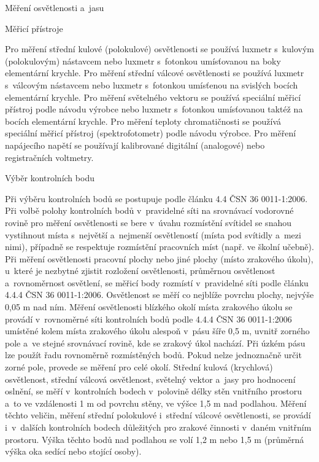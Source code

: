 \chap Měření osvětlenosti a~jasu

\sec Měřicí přístroje

Pro měření střední kulové (polokulové) osvětlenosti se používá luxmetr s~kulovým (polokulovým) nástavcem nebo luxmetr
s~fotonkou umísťovanou na boky elementární krychle. Pro měření střední válcové osvětlenosti se používá luxmetr
s~válcovým nástavcem nebo luxmetr s~fotonkou umísťenou na svislých bocích elementární krychle.
Pro měření světelného vektoru se používá speciální měřicí přístroj podle návodu výrobce nebo luxmetr s~fotonkou
umísťovanou taktéž na bocích elementární krychle. Pro měření teploty chromatičnosti se používá speciální
měřicí přístroj (spektrofotometr) podle návodu výrobce. Pro měření napájecího napětí se používají kalibrované
digitální (analogové) nebo registračních voltmetry.

\sec Výběr kontrolních bodu

Při výběru kontrolních bodů se postupuje podle článku 4.4 ČSN 36 0011-1:2006. Při volbě polohy kontrolních bodů
v~pravidelné síti na srovnávací vodorovné rovině pro měření osvětlenosti se bere v~úvahu rozmístění svítidel
se snahou vystihnout místa s~největší a~nejmenší osvětleností (místa pod svítidly a~mezi nimi), případně
se respektuje rozmístění pracovních míst (např. ve školní učebně).
\medskip
Při měření osvětlenosti pracovní plochy nebo jiné plochy (místo zrakového úkolu), u~které je nezbytné zjistit
rozložení osvětlenosti, průměrnou osvětlenost a~rovnoměrnost osvětlení, se měřicí body rozmístí v~pravidelné
síti podle článku 4.4.4 ČSN 36 0011-1:2006. Osvětlenost se měří co nejblíže povrchu plochy, nejvýše 0,05 m nad ním.
\medskip
Měření osvětlenosti blízkého okolí místa zrakového úkolu se provádí v~rovnoměrné síti kontrolních bodů
podle 4.4.4 ČSN 36 0011-1:2006 umístěné kolem místa zrakového úkolu alespoň v~pásu šíře 0,5 m, uvnitř
zorného pole a~ve stejné srovnávací rovině, kde se zrakový úkol nachází. Při úzkém pásu lze použít
řadu rovnoměrně rozmístěných bodů. Pokud nelze jednoznačně určit zorné pole, provede se měření pro celé okolí.
Střední kulová (krychlová) osvětlenost, střední válcová osvětlenost, světelný vektor a~jasy pro hodnocení
oslnění, se měří v~kontrolních bodech v~polovině délky stěn vnitřního prostoru a~to ve vzdálenosti 1 m
od povrchu stěny, ve výšce 1,5 m nad podlahou.
\medskip
Měření těchto veličin, měření střední polokulové i~střední válcové osvětlenosti, se provádí i~v~dalších
kontrolních bodech důležitých pro zrakové činnosti v~daném vnitřním prostoru. Výška těchto bodů nad
podlahou se volí 1,2 m nebo 1,5 m (průměrná výška oka sedící nebo stojící osoby).

